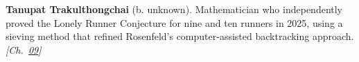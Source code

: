 \textbf{Tanupat Trakulthongchai} (b. unknown). Mathematician who independently proved the Lonely Runner Conjecture for nine and ten runners in 2025, using a sieving method that refined Rosenfeld's computer-assisted backtracking approach. \emph{[Ch.~\hyperref[ch:arrowtheoremtopology]{09}]}

